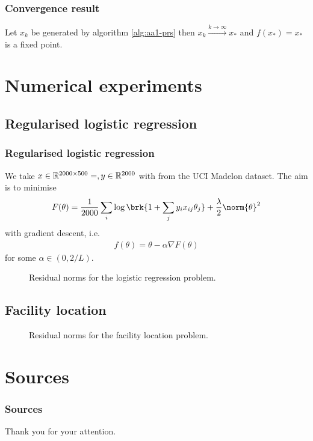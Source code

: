 \begin{frame}
	\frametitle{Convergence result}
	\begin{theorem}[Convergence]
		Let $x_k$ be generated by algorithm \ref{alg:aa1-prs} then $x_k\xrightarrow{k\to\infty}x_*$ and $f(x_*)=x_*$ is a fixed point.
	\end{theorem}
\end{frame}


\section{Numerical experiments}

\subsection{Regularised logistic regression}

\begin{frame}
	\frametitle{Regularised logistic regression}
	We take $x\in\mathbb{R}^{2000\times 500}=, y\in\mathbb{R}^{2000}$ with  from the UCI Madelon dataset. The aim is to minimise
	\begin{align*}
		F(\theta) = \frac{1}{2000}\sum_{i}\log\brk{1+\sum_jy_ix_{ij}\theta_j}+\frac{\lambda}{2}\norm{\theta}^2
	\end{align*}
	with gradient descent, i.e.\
	\begin{align*}
		f(\theta) = \theta-\alpha\nabla F(\theta)
	\end{align*}
	for some $\alpha\in(0,2/L)$.
\end{frame}

\begin{frame}
	\begin{figure}
		\centering
		
		\caption{Residual norms for the logistic regression problem.}
	\end{figure}
\end{frame}

\subsection*{Facility location}

\begin{frame}
	
\end{frame}

\begin{frame}
	\begin{figure}
		\centering
		
		\caption{Residual norms for the facility location problem.}
	\end{figure}
\end{frame}

\section{Sources}

\begin{frame}[allowframebreaks]
	\frametitle{Sources}
	\nocite{*}
%	
%	
	\printbibliography
\end{frame}


\begin{frame}[plain]
	\begin{center}
		\Large{{Thank you for your attention.}}
	\end{center}
\end{frame}

\frame[plain]


